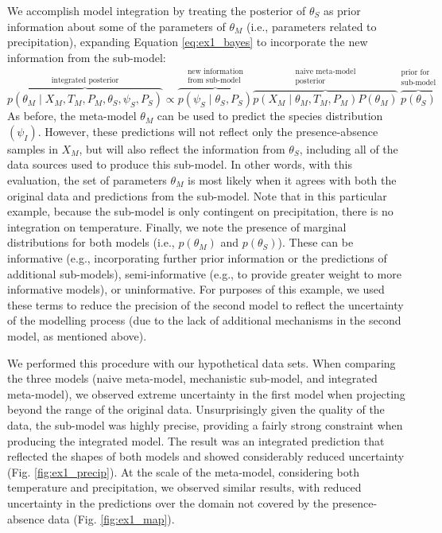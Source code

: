 We accomplish model integration by treating the posterior of \(\theta_S\) as prior information about some of the parameters of \(\theta_M\) (i.e., parameters related to precipitation), expanding Equation \ref{eq:ex1_bayes} to incorporate the new information from the sub-model:
\begin{equation}
	\label{eq:ex1_integrated}
	\overbrace{p(\theta_M \mid X_M, T_M, P_M, \theta_S, \psi_S, P_S)}^\text{integrated posterior}
	\propto
	\overbrace{p\left (\psi_S \mid \theta_S,P_S \right )}^{\substack{\text{new information} \\ \text{from sub-model}}}
	\overbrace{p \left(X_M \mid \theta_M, T_M, P_M \right) P \left(\theta_M \right)}^{\substack{\text{naive meta-model} \\ \text{posterior}}}
	\overbrace{p \left(\theta_S \right)}^{\substack{\text{prior for} \\ \text{sub-model}}}	
\end{equation}
As before, the meta-model \(\theta_M\) can be used to predict the species distribution \((\psi_I)\).
However, these predictions will not reflect only the presence-absence samples in \(X_M\), but will also reflect the information from \(\theta_S\), including all of the data sources used to produce this sub-model.
In other words, with this evaluation, the set of parameters $\theta_M$ is most likely when it agrees with both the original data and predictions from the sub-model. 
Note that in this particular example, because the sub-model is only contingent on precipitation, there is no integration on temperature. 
Finally, we note the presence of marginal distributions for both models (i.e., \(p(\theta_M)\) and \(p(\theta_S)\)).
These can be informative (e.g., incorporating further prior information or the predictions of additional sub-models), semi-informative (e.g., to provide greater weight to more informative models), or uninformative.
For purposes of this example, we used these terms to reduce the precision of the second model to reflect the uncertainty of the modelling process (due to the lack of additional mechanisms in the second model, as mentioned above).

We performed this procedure with our hypothetical data sets.
When comparing the three models (naive meta-model, mechanistic sub-model, and integrated meta-model), we observed extreme uncertainty in the first model when projecting beyond the range of the original data.
Unsurprisingly given the quality of the data, the sub-model was highly precise, providing a fairly strong constraint when producing the integrated model.
The result was an integrated prediction that reflected the shapes of both models and showed considerably reduced uncertainty (Fig. \ref{fig:ex1_precip}).
At the scale of the meta-model, considering both temperature and precipitation, we observed similar results, with reduced uncertainty in the predictions over the domain not covered by the presence-absence data (Fig. \ref{fig:ex1_map}).



